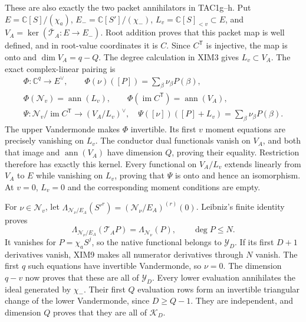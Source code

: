 \documentclass[11pt,a4paper]{article}
\begin{document}
These are also exactly the two packet annihilators in TAC1g--h.
Put $E=\mathbb C[S]/(\chi_a)$, $E_-=\mathbb C[S']/(\chi_-)$,
$L_v=\mathbb C[S]_{<v}\subset E$, and
$V_A=\ker(\overline{\mathcal T}_A:E\longrightarrow E_-)$.
Root addition proves that this packet map is well defined, and in
root-value coordinates it is $C$. Since $C^{\mathsf T}$ is injective,
the map is onto and $\dim V_A=q-Q$. The degree calculation in XIM3
gives $L_v\subset V_A$. The exact complex-linear pairing is
\[
\begin{gathered}
 \Phi:\mathbb C^q\longrightarrow E^\vee,\qquad
 \Phi(\nu)([P])=\sum_\beta\nu_\beta P(\beta),\\
 \Phi(\mathscr N_v)=\operatorname{ann}(L_v),\qquad
 \Phi(\operatorname{im}C^{\mathsf T})=\operatorname{ann}(V_A),\\
 \Psi:\mathscr N_v/\operatorname{im}C^{\mathsf T}
       \longrightarrow (V_A/L_v)^\vee,\quad
 \Psi([\nu])([P]+L_v)=\sum_\beta\nu_\beta P(\beta).
\end{gathered}\tag{XIM8a}
\]
The upper Vandermonde makes $\Phi$ invertible. Its first $v$ moment
equations are precisely vanishing on $L_v$. The conductor dual
functionals vanish on $V_A$, and both that image and
$\operatorname{ann}(V_A)$ have dimension $Q$, proving their equality.
Restriction therefore has exactly this kernel. Every functional on
$V_A/L_v$ extends linearly from $V_A$ to $E$ while vanishing on
$L_v$, proving that $\Psi$ is onto and hence an isomorphism.
At $v=0$, $L_v=0$ and the corresponding moment conditions are empty.

For $\nu\in\mathscr N_v$, let
$\Lambda_{\mathcal N_\nu/E_A}(S'^r)=(\mathcal N_\nu/E_A)^{(r)}(0)$.
Leibniz's finite identity proves
\[
 \Lambda_{\mathcal N_\nu/E_A}(\mathcal T_AP)
       =\Lambda_{\mathcal N_\nu}(P),\qquad \deg P\le N.
 \tag{XIM9}
\]
It vanishes for $P=\chi_aS^j$, so the native functional belongs
to $\mathscr Y_D$. If its first $D+1$ derivatives vanish, XIM9
makes all numerator derivatives through $N$ vanish. The first $q$
such equations have invertible Vandermonde, so $\nu=0$.
The dimension $q-v$ now proves that these are all of $\mathscr Y_D$.
Every lower evaluation annihilates the ideal generated by $\chi_-$.
Their first $Q$ evaluation rows form an invertible triangular change
of the lower Vandermonde, since $D\ge Q-1$. They are independent,
and dimension $Q$ proves that they are all of $\mathscr K_D$.
\end{document}
